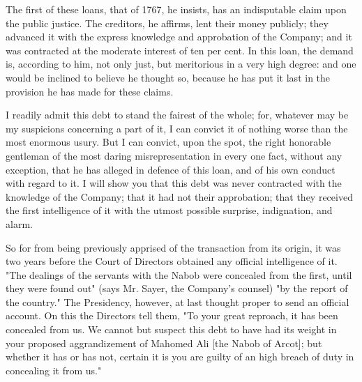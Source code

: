 The first of these loans, that of 1767, he insists, has an indisputable claim upon the public justice. The creditors, he affirms, lent their money publicly; they advanced it with the express knowledge and approbation of the Company; and it was contracted at the moderate interest of ten per cent. In this loan, the demand is, according to him, not only just, but meritorious in a very high degree: and one would be inclined to believe he thought so, because he has put it last in the provision he has made for these claims.

I readily admit this debt to stand the fairest of the whole; for, whatever may be my suspicions concerning a part of it, I can convict it of nothing worse than the most enormous usury. But I can convict, upon the spot, the right honorable gentleman of the most daring misrepresentation in every one fact, without any exception, that he has alleged in defence of this loan, and of his own conduct with regard to it. I will show you that this debt was never contracted with the knowledge of the Company; that it had not their approbation; that they received the first intelligence of it with the utmost possible surprise, indignation, and alarm.

So for from being previously apprised of the transaction from its origin, it was two years before the Court of Directors obtained any official intelligence of it. "The dealings of the servants with the Nabob were concealed from the first, until they were found out" (says Mr. Sayer, the Company's counsel) "by the report of the country." The Presidency, however, at last thought proper to send an official account. On this the Directors tell them, "To your great reproach, it has been concealed from us. We cannot but suspect this debt to have had its weight in your proposed aggrandizement of Mahomed Ali [the Nabob of Arcot]; but whether it has or has not, certain it is you are guilty of an high breach of duty in concealing it from us."

